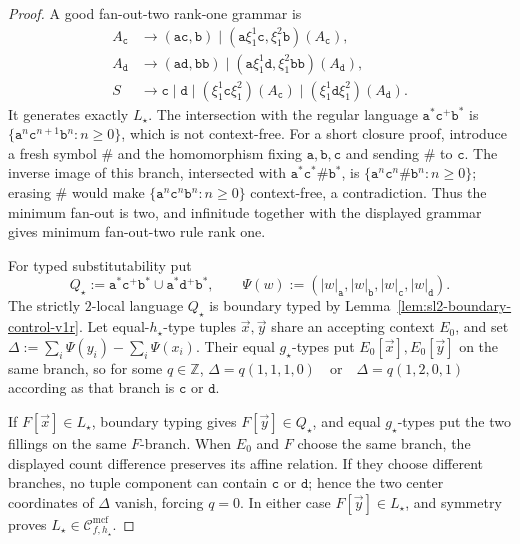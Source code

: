 \documentclass[11pt]{article}
\numberwithin{equation}{section}
\theoremstyle{plain}
\theoremstyle{definition}
\theoremstyle{remark}
\newcommand{\Cmcf}[2]{\mathcal{C}^{\mathrm{mcf}}_{#1,#2}}
\newcommand{\tuple}[1]{\vec{#1}}
\theoremstyle{plain}
\begin{document}
\begin{proof}
A good fan-out-two rank-one grammar is
\[
\begin{aligned}
 A_{\mathtt c}
   &\to(\mathtt a\mathtt c,\mathtt b)
     \mid(\mathtt a\xi_1^1\mathtt c,\xi_1^2\mathtt b)(A_{\mathtt c}),\\
 A_{\mathtt d}
   &\to(\mathtt a\mathtt d,\mathtt b\mathtt b)
     \mid(\mathtt a\xi_1^1\mathtt d,\xi_1^2\mathtt b\mathtt b)(A_{\mathtt d}),\\
 S&\to\mathtt c\mid\mathtt d
   \mid(\xi_1^1\mathtt c\xi_1^2)(A_{\mathtt c})
   \mid(\xi_1^1\mathtt d\xi_1^2)(A_{\mathtt d}).
\end{aligned}
\]
It generates exactly $L_\star$.  The intersection with the regular language
$\mathtt a^*\mathtt c^+\mathtt b^*$ is
$\{\mathtt a^n\mathtt c^{n+1}\mathtt b^n:n\ge0\}$, which is not
context-free.  For a short closure proof, introduce a fresh symbol
$\mathtt\#$ and the homomorphism fixing $\mathtt a,\mathtt b,\mathtt c$ and
sending $\mathtt\#$ to $\mathtt c$.  The inverse image of this branch,
intersected with
$\mathtt a^*\mathtt c^*\mathtt\#\mathtt b^*$, is
$\{\mathtt a^n\mathtt c^n\mathtt\#\mathtt b^n:n\ge0\}$; erasing
$\mathtt\#$ would make $\{\mathtt a^n\mathtt c^n\mathtt b^n:n\ge0\}$
context-free, a contradiction.  Thus the minimum fan-out is two, and
infinitude together with the displayed grammar gives minimum fan-out-two rule
rank one.

For typed substitutability put
\[
 Q_\star:=\mathtt a^*\mathtt c^+\mathtt b^*
          \cup\mathtt a^*\mathtt d^+\mathtt b^*,
 \qquad
 \Psi(w):=(|w|_{\mathtt a},|w|_{\mathtt b},
            |w|_{\mathtt c},|w|_{\mathtt d}).
\]
The strictly $2$-local language $Q_\star$ is boundary typed by
Lemma~\ref{lem:sl2-boundary-control-v1r}.  Let equal-$h_\star$-type tuples
$\tuple x,\tuple y$ share an accepting context $E_0$, and set
\(\Delta:=\sum_i\Psi(y_i)-\sum_i\Psi(x_i).\)
Their equal $g_\star$-types put $E_0[\tuple x],E_0[\tuple y]$ on the same
branch, so for some $q\in\mathbb Z$,
\(\Delta=q(1,1,1,0)\quad\text{or}\quad\Delta=q(1,2,0,1)\)
according as that branch is $\mathtt c$ or $\mathtt d$.

If $F[\tuple x]\in L_\star$, boundary typing gives
$F[\tuple y]\in Q_\star$, and equal $g_\star$-types put the two fillings on
the same $F$-branch.  When $E_0$ and $F$ choose the same branch, the displayed
count difference preserves its affine relation.  If they choose different
branches, no tuple component can contain $\mathtt c$ or $\mathtt d$; hence the
two center coordinates of $\Delta$ vanish, forcing $q=0$.  In either case
$F[\tuple y]\in L_\star$, and symmetry proves
$L_\star\in\Cmcf{f}{h_\star}$.


\end{proof}
\end{document}
